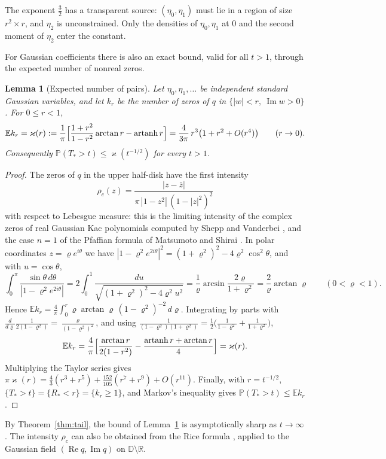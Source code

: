 \documentclass[11pt]{amsart}
\newtheorem{lemma}[theorem]{Lemma}
\theoremstyle{definition}
\theoremstyle{remark}
\numberwithin{equation}{section}
\newcommand{\R}{\mathbb{R}}
\newcommand{\D}{\mathbb{D}}
\newcommand{\E}{\mathbb{E}}
\newcommand{\PP}{\mathbb{P}}
\DeclareMathOperator{\re}{Re}
\DeclareMathOperator{\im}{Im}
\begin{document}
The exponent $\frac32$ has a transparent source: $(\eta_0,\eta_1)$ must lie in a region of size $r^2\times r$, and $\eta_2$ is unconstrained. Only the densities of $\eta_0,\eta_1$ at $0$ and the second moment of $\eta_2$ enter the constant.

For Gaussian coefficients there is also an exact bound, valid for all $t>1$, through the expected number of nonreal zeros.

\begin{lemma}[Expected number of pairs]\label{lem:pairs}
Let $\eta_0,\eta_1,\dots$ be independent standard Gaussian variables, and let $k_r$ be the number of zeros of $q$ in $\{|w|<r,\ \im w>0\}$. For $0\le r<1$,
\[
\E k_r=\varkappa(r):=\frac1\pi\Bigl[\frac{1+r^2}{1-r^2}\arctan r-\operatorname{artanh}r\Bigr]=\frac4{3\pi}\,r^3\bigl(1+r^2+O(r^4)\bigr)\qquad(r\to0).
\]
Consequently $\PP(T_*>t)\le\varkappa(t^{-1/2})$ for every $t>1$.
\end{lemma}

\begin{proof}
The zeros of $q$ in the upper half-disk have the first intensity
\[
\rho_c(z)=\frac{|z-\bar z|}{\pi\,|1-z^2|\,(1-|z|^2)^2}
\]
with respect to Lebesgue measure: this is the limiting intensity of the complex zeros of real Gaussian Kac polynomials computed by Shepp and Vanderbei \cite[Theorem~1.2]{SV}, and the case $n=1$ of the Pfaffian formula of Matsumoto and Shirai \cite[Theorem~2.7]{MS}. In polar coordinates $z=\varrho e^{i\theta}$ we have $|1-\varrho^2e^{2i\theta}|^2=(1+\varrho^2)^2-4\varrho^2\cos^2\theta$, and with $u=\cos\theta$,
\[
\int_0^{\pi}\frac{\sin\theta\,d\theta}{|1-\varrho^2e^{2i\theta}|}=2\int_0^1\frac{du}{\sqrt{(1+\varrho^2)^2-4\varrho^2u^2}}=\frac1\varrho\arcsin\frac{2\varrho}{1+\varrho^2}=\frac2\varrho\arctan\varrho\qquad(0<\varrho<1).
\]
Hence $\E k_r=\frac4\pi\int_0^r\varrho\arctan\varrho\,(1-\varrho^2)^{-2}\,d\varrho$. Integrating by parts with $\frac{d}{d\varrho}\frac1{2(1-\varrho^2)}=\frac{\varrho}{(1-\varrho^2)^2}$, and using $\frac1{(1-\varrho^2)(1+\varrho^2)}=\frac12\bigl(\frac1{1-\varrho^2}+\frac1{1+\varrho^2}\bigr)$,
\[
\E k_r=\frac4\pi\Bigl[\frac{\arctan r}{2(1-r^2)}-\frac{\operatorname{artanh}r+\arctan r}4\Bigr]=\varkappa(r).
\]
Multiplying the Taylor series gives $\pi\varkappa(r)=\frac43(r^3+r^5)+\frac{152}{105}(r^7+r^9)+O(r^{11})$. Finally, with $r=t^{-1/2}$, $\{T_*>t\}=\{R_*<r\}=\{k_r\ge1\}$, and Markov's inequality gives $\PP(T_*>t)\le\E k_r$.
\end{proof}

By Theorem~\ref{thm:tail}, the bound of Lemma~\ref{lem:pairs} is asymptotically sharp as $t\to\infty$. The intensity $\rho_c$ can also be obtained from the Rice formula \cite[Theorem~6.2]{AW}, applied to the Gaussian field $(\re q,\im q)$ on $\D\setminus\R$.
\end{document}
